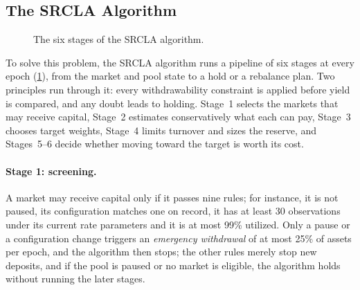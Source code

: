 \documentclass[sigconf]{acmart}
\begin{document}
\subsection{The SRCLA Algorithm}
\label{sec:method}

\begin{figure}[t]
  \centering
  
  \caption{The six stages of the SRCLA algorithm.}
  \label{fig:stages}
\end{figure}

To solve this problem, the SRCLA algorithm runs a pipeline of six stages at every epoch (\cref{fig:stages}), from the market and pool state to a hold or a rebalance plan. Two principles run through it: every withdrawability constraint is applied before yield is compared, and any doubt leads to holding. Stage~1 selects the markets that may receive capital, Stage~2 estimates conservatively what each can pay, Stage~3 chooses target weights, Stage~4 limits turnover and sizes the reserve, and Stages~5--6 decide whether moving toward the target is worth its cost.

\paragraph{Stage 1: screening.}
A market may receive capital only if it passes nine rules; for instance, it is not paused, its configuration matches one on record, it has at least 30 observations under its current rate parameters and it is at most 99\% utilized. Only a pause or a configuration change triggers an \emph{emergency withdrawal} of at most 25\% of assets per epoch, and the algorithm then stops; the other rules merely stop new deposits, and if the pool is paused or no market is eligible, the algorithm holds without running the later stages.
\end{document}
